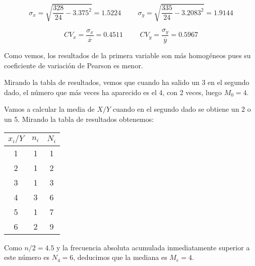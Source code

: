 \begin{equation*}
    \sigma_{x} = \sqrt{\dfrac{328}{24}-3.375^2} = 1.5224
    \hspace{1cm}
    \sigma_{y} = \sqrt{\dfrac{335}{24}-3.2083^2} = 1.9144
\end{equation*}

\begin{equation*}
    CV_{x} = \dfrac{\sigma_x}{\overline{x}} = 0.4511
    \hspace{1cm}
    CV_{y} = \dfrac{\sigma_y}{\overline{y}} = 0.5967
\end{equation*}

Como vemos, los resultados de la primera variable son más homogéneos pues su coeficiente de variación de Pearson es menor.

\subproblem
Mirando la tabla de resultados, vemos que cuando ha salido un 3 en el segundo dado, el número que más veces ha aparecido es el 4, con 2 veces, luego $M_0=4$.

\subproblem
Vamos a calcular la media de $X/Y$ cuando en el segundo dado se obtiene un 2 o un 5. Mirando la tabla de resultados obtenemos:

\begin{table}[ht]
    \begin{tabular}{|c|c|c|}
        \hline
         $x_i/Y$ & $n_{i}$ & $N_{i}$ \\ \hline
         1 & 1 & 1 \\ \hline 
         2 & 1 & 2 \\ \hline 
         3 & 1 & 3 \\ \hline 
         4 & 3 & 6 \\ \hline 
         5 & 1 & 7 \\ \hline  
         6 & 2 & 9 \\ \hline 
    \end{tabular}
\end{table}

Como $n/2 = 4.5$ y la frecuencia absoluta acumulada inmediatamente superior a este número es $N_{4} = 6$, deducimos que la mediana es $M_e = 4$.
